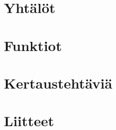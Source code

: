 \part{Yhtälöt}
    
    
    
    
    
    
    
\part{Funktiot}
    
    
    
    
    

\part{Kertaustehtäviä}
    
    
    


\part*{Liitteet}
\appendix
    
    
    
    
    
    
    
    
